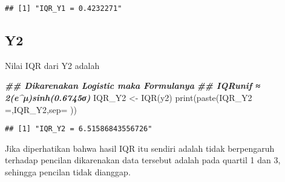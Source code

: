 \documentclass[
]{article}
\newenvironment{Shaded}{\begin{snugshade}}{\end{snugshade}}
\newcommand{\AttributeTok}[1]{\textcolor[rgb]{0.77,0.63,0.00}{#1}}
\newcommand{\DocumentationTok}[1]{\textcolor[rgb]{0.56,0.35,0.01}{\textbf{\textit{#1}}}}
\newcommand{\FunctionTok}[1]{\textcolor[rgb]{0.00,0.00,0.00}{#1}}
\newcommand{\NormalTok}[1]{#1}
\newcommand{\OtherTok}[1]{\textcolor[rgb]{0.56,0.35,0.01}{#1}}
\newcommand{\StringTok}[1]{\textcolor[rgb]{0.31,0.60,0.02}{#1}}
\begin{document}
\begin{verbatim}
## [1] "IQR_Y1 = 0.4232271"
\end{verbatim}

\hypertarget{y2-3}{%
\subsection{Y2}\label{y2-3}}

Nilai IQR dari Y2 adalah

\begin{Shaded}
\begin{Highlighting}[]
\DocumentationTok{\#\# Dikarenakan Logistic maka Formulanya }
\DocumentationTok{\#\# IQRunif ≈ 2(e\^{}µ)sinh(0.6745σ)}
\NormalTok{IQR\_Y2 }\OtherTok{\textless{}{-}} \FunctionTok{IQR}\NormalTok{(y2)}
\FunctionTok{print}\NormalTok{(}\FunctionTok{paste}\NormalTok{(}\StringTok{\textquotesingle{}IQR\_Y2 =\textquotesingle{}}\NormalTok{,IQR\_Y2,}\AttributeTok{sep=}\StringTok{\textquotesingle{} \textquotesingle{}}\NormalTok{))}
\end{Highlighting}
\end{Shaded}

\begin{verbatim}
## [1] "IQR_Y2 = 6.51586843556726"
\end{verbatim}

Jika diperhatikan bahwa hasil IQR itu sendiri adalah tidak berpengaruh
terhadap pencilan dikarenakan data tersebut adalah pada quartil 1 dan 3,
sehingga pencilan tidak dianggap.
\end{document}
